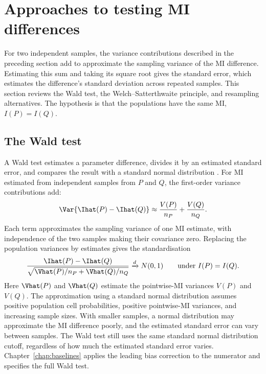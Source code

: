 \section{Approaches to testing MI differences}
\allowdisplaybreaks
\label{sec:welch-background}

For two independent samples, the variance contributions described in the
preceding section add to approximate the sampling variance of the MI
difference. Estimating this sum and taking its square root gives the
standard error, which estimates the difference's standard deviation across
repeated samples. This section
reviews the Wald test, the Welch--Satterthwaite principle, and resampling
alternatives. The hypothesis is that the populations
have the same MI, \(I(P)=I(Q)\).

\subsection{The Wald test}

A Wald test estimates a parameter difference, divides it by an estimated
standard error, and compares the result with a standard normal distribution
\citep{wald1943,vanderVaart1998}.
For MI estimated from independent samples from \(P\) and \(Q\), the
first-order variance contributions add:
\begin{equation}
  \Var\{\Ihat(P)-\Ihat(Q)\}
  \approx \frac{V(P)}{n_P}+\frac{V(Q)}{n_Q}.
  \label{eq:background-two-sample-variance}
\end{equation}
Each term approximates the sampling variance of one MI estimate, with
independence of the two samples making their covariance zero. Replacing
the population variances by estimates gives the standardisation
\begin{equation}
  \frac{\Ihat(P)-\Ihat(Q)}
       {\sqrt{\Vhat(P)/n_P+\Vhat(Q)/n_Q}}
  \xrightarrow{d}N(0,1)
  \qquad\text{under }I(P)=I(Q).
  \label{eq:background-wald-standardisation}
\end{equation}
Here \(\Vhat(P)\) and \(\Vhat(Q)\) estimate the pointwise-MI variances
\(V(P)\) and \(V(Q)\). The approximation using a standard normal distribution
assumes positive population cell probabilities, positive pointwise-MI
variances, and increasing sample sizes. With smaller samples, a normal
distribution may approximate the MI difference poorly, and the estimated
standard error can vary between samples. The Wald test still uses the same standard normal distribution
cutoff, regardless of how much the estimated standard error varies.
Chapter~\ref{chap:baselines} applies the leading bias correction to the
numerator and specifies the full Wald test.

